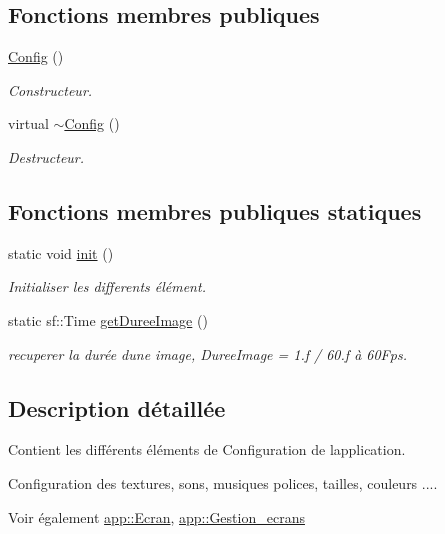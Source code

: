\subsection*{Fonctions membres publiques}
\begin{DoxyCompactItemize}
\item 
\hyperlink{classapp_1_1_config_a6b5877b87cbfef7bb28ed405dfa3ea62}{Config} ()
\begin{DoxyCompactList}\small\item\em Constructeur. \end{DoxyCompactList}\item 
virtual \hyperlink{classapp_1_1_config_af8bea439b3dd6daa60079937d43b0dcb}{$\sim$\+Config} ()
\begin{DoxyCompactList}\small\item\em Destructeur. \end{DoxyCompactList}\end{DoxyCompactItemize}
\subsection*{Fonctions membres publiques statiques}
\begin{DoxyCompactItemize}
\item 
static void \hyperlink{classapp_1_1_config_a8680abec2844bbb045614662a218b5d5}{init} ()
\begin{DoxyCompactList}\small\item\em Initialiser les differents élément. \end{DoxyCompactList}\item 
static sf\+::\+Time \hyperlink{classapp_1_1_config_a379b1f1ac039e8c2cb92567b994fe74c}{get\+Duree\+Image} ()
\begin{DoxyCompactList}\small\item\em recuperer la durée d\textquotesingle{}une image, Duree\+Image = 1.\+f / 60.\+f à 60\+Fps. \end{DoxyCompactList}\end{DoxyCompactItemize}


\subsection{Description détaillée}
Contient les différents éléments de Configuration de l\textquotesingle{}application. 

Configuration des textures, sons, musiques polices, tailles, couleurs ....

\begin{DoxySeeAlso}{Voir également}
\hyperlink{classapp_1_1_ecran}{app\+::\+Ecran}, \hyperlink{classapp_1_1_gestion__ecrans}{app\+::\+Gestion\+\_\+ecrans} 
\end{DoxySeeAlso}


